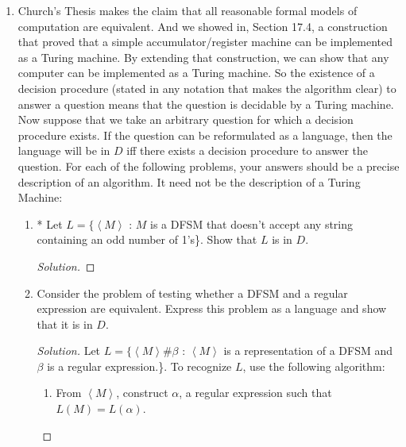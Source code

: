 \documentclass[10pt]{article}
\newcommand{\brackets}[1]{\left< #1 \right>}
\begin{document}
\begin{enumerate}[1)]
\begin{proof}[Solution]
\begin{center}
\begin{tabular}{|c|c|}
\hline
\end{tabular}
\end{center}
(\texttt{q00}, \texttt{a01}, \texttt{q01}, \texttt{a10}, $\rightarrow$), (\texttt{q00}, \texttt{a10}, \texttt{q01}, \texttt{a01}, $\rightarrow$), (\texttt{q00}, \texttt{a00}, \texttt{q10}, \texttt{a00}, $\rightarrow$), (\texttt{q00}, \texttt{a11}, \texttt{q00}, \texttt{a11}, $\rightarrow$), (\texttt{q01}, \texttt{a01}, \texttt{q00}, \texttt{a11}, $\rightarrow$), (\texttt{q01}, \texttt{a10}, \texttt{q00}, \texttt{a10}, $\leftarrow$), (\texttt{q01}, \texttt{a00}, \texttt{q00}, \texttt{a11}, $\rightarrow$), (\texttt{q01}, \texttt{a11}, \texttt{q01}, \texttt{a11}, $\rightarrow$)
\end{proof}


\item
Church’s Thesis makes the claim that all reasonable formal models of computation are equivalent.  And we showed in, Section 17.4, a construction that proved that a simple accumulator/register machine can be implemented as a Turing machine.  By extending that construction, we can show that any computer can be implemented as a Turing machine.  So the existence of a decision procedure (stated in any notation that makes the algorithm clear) to answer a question means that the question is decidable by a Turing machine.\\

\noindent
Now suppose that we take an arbitrary question for which a decision procedure exists.  If the question can be reformulated as a language, then the language will be in $D$ iff there exists a decision procedure to answer the question.  For each of the following problems, your answers should be a precise description of an algorithm. It need not be the description of a Turing Machine:
\begin{enumerate}
\item
* Let $L = \{\brackets{M}$ : $M$ is a DFSM that doesn’t accept any string containing an odd number of 1’s\}.  Show that 
$L$ is in $D$.
\begin{proof}[Solution]
\end{proof}

\item
Consider the problem of testing whether a DFSM and a regular expression are equivalent.  Express this problem as a language and show that it is in $D$.
\begin{proof}[Solution]
Let $L = \{\brackets{M}\#\beta$ : $\brackets{M}$ is a representation of a DFSM and $\beta$ is a regular expression.\}.  To recognize $L$, use the following algorithm:
\begin{enumerate}[1.]
\item
From $\brackets{M}$, construct $\alpha$, a regular expression such that $L(M) = L(\alpha)$.


\end{enumerate}
\end{proof}
\end{enumerate}
\end{enumerate}
\end{document}
